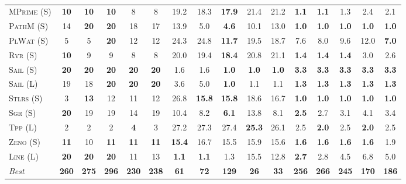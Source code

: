 \documentclass[11pt,landscape]{article}
\begin{document}
\begin{table*}[tb]
{\begin{tabular}{|l||ccccc||ccccc||ccccc||}
\textsc{MPrime} (S)&\textbf{10}&\textbf{10}&\textbf{10}&8&8&19.2&18.3&\textbf{17.9}&21.4&21.2&\textbf{1.1}&\textbf{1.1}&1.3&2.4&2.1\\
\textsc{PathM} (S)&14&\textbf{20}&\textbf{20}&18&17&13.9&5.0&\textbf{4.6}&10.1&13.0&\textbf{1.0}&\textbf{1.0}&\textbf{1.0}&\textbf{1.0}&\textbf{1.0}\\
\textsc{PlWat} (S)&5&5&\textbf{20}&12&12&24.3&24.8&\textbf{11.7}&19.5&18.7&7.6&8.0&9.6&12.0&\textbf{7.0}\\
\textsc{Rvr} (S)&\textbf{10}&9&9&8&8&20.0&19.4&\textbf{18.4}&20.8&21.1&\textbf{1.4}&\textbf{1.4}&\textbf{1.4}&3.0&2.6\\
\textsc{Sail} (S)&\textbf{20}&\textbf{20}&\textbf{20}&\textbf{20}&\textbf{20}&1.6&1.6&\textbf{1.0}&\textbf{1.0}&\textbf{1.0}&\textbf{3.3}&\textbf{3.3}&\textbf{3.3}&\textbf{3.3}&\textbf{3.3}\\
\textsc{Sail} (L)&19&18&\textbf{20}&\textbf{20}&\textbf{20}&3.6&5.0&\textbf{1.0}&1.1&1.1&\textbf{1.3}&\textbf{1.3}&\textbf{1.3}&\textbf{1.3}&\textbf{1.3}\\
\textsc{Stlrs} (S)&3&\textbf{13}&12&11&12&26.8&\textbf{15.8}&\textbf{15.8}&18.6&16.7&\textbf{1.0}&\textbf{1.0}&\textbf{1.0}&\textbf{1.0}&\textbf{1.0}\\
\textsc{Sgr} (S)&\textbf{20}&19&19&14&19&10.4&8.2&\textbf{6.1}&13.8&8.1&\textbf{2.5}&2.7&3.1&4.1&3.4\\
\textsc{Tpp} (L)&2&2&2&\textbf{4}&3&27.2&27.3&27.4&\textbf{25.3}&26.1&2.5&\textbf{2.0}&2.5&\textbf{2.0}&2.5\\
\textsc{Zeno} (S)&\textbf{11}&10&\textbf{11}&\textbf{11}&\textbf{11}&\textbf{15.4}&16.7&15.5&15.9&15.6&\textbf{1.6}&\textbf{1.6}&\textbf{1.6}&\textbf{1.6}&1.9\\
\textsc{Line} (L)&\textbf{20}&\textbf{20}&\textbf{20}&11&13&\textbf{1.1}&\textbf{1.1}&1.3&15.5&12.8&\textbf{2.7}&2.8&4.5&6.8&5.0
\\\hline
\textit{Best}&\textbf{260}&\textbf{275}&\textbf{296}&\textbf{230}&\textbf{238}&\textbf{61}&\textbf{72}&\textbf{129}&\textbf{26}&\textbf{33}&\textbf{256}&\textbf{266}&\textbf{245}&\textbf{170}&\textbf{186}\\\hline

        \end{tabular}}
        \caption{}
        \label{tab:all-patty}
        \end{table*}
        
\end{document}
